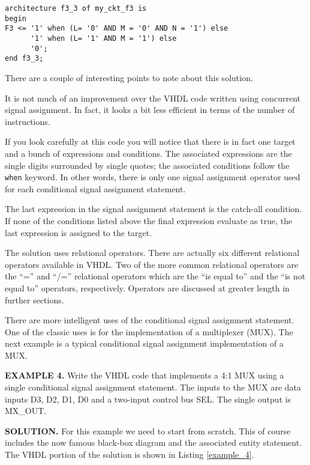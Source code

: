 \begin{lstlisting}[label=example_3, caption=Solution of Example 3.]
architecture f3_3 of my_ckt_f3 is
begin
F3 <= '1' when (L= '0' AND M = '0' AND N = '1') else
      '1' when (L= '1' AND M = '1') else
      '0';
end f3_3;
\end{lstlisting}
There are a couple of interesting points to note about this solution.
\begin{my_list}
\item It is not much of an improvement over the VHDL code written using concurrent signal assignment. In fact, it looks a bit less efficient in terms of the number of instructions.
\item If you look carefully at this code you will notice that there is in fact one target and a bunch of expressions and conditions. The associated expressions are the single digits surrounded by single quotes; the associated conditions follow the \texttt{when} keyword. In other words, there is only one signal assignment operator used for each conditional signal assignment statement.
\item The last expression in the signal assignment statement is the catch-all condition. If none of the conditions listed above the final expression evaluate as true, the last expression is assigned to the target.
\item The solution uses relational operators. There are actually six different relational operators available in VHDL. Two of the more common relational operators are the ``='' and ``/='' relational operators which are the ``is equal to'' and the ``is not equal to'' operators, respectively. Operators are discussed at greater length in further sections.
\end{my_list}
There are more intelligent uses of the conditional signal assignment statement. One of the classic uses is for the implementation of a multiplexer (MUX). The next example is a typical conditional signal assignment implementation of a MUX.

\begin{leftbar}
\noindent
\textbf{EXAMPLE 4.}
Write the VHDL code that implements a 4:1 MUX using a single conditional signal assignment statement. The inputs to the MUX are data inputs D3, D2, D1, D0 and a two-input control bus SEL. The single output is MX\_OUT.
\end{leftbar}
\noindent
\textbf{SOLUTION.} For this example we need to start from scratch. This of course includes the now famous black-box diagram and the associated entity statement. The VHDL portion of the solution is shown in Listing \ref{example_4}.

